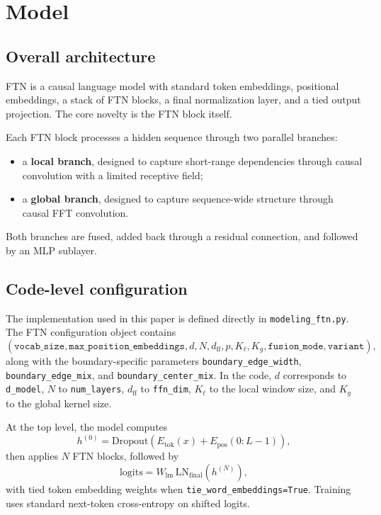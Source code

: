 \documentclass[11pt]{article}
\begin{document}
\section{Model}
\subsection{Overall architecture}
FTN is a causal language model with standard token embeddings, positional embeddings, a stack of FTN blocks, a final normalization layer, and a tied output projection. The core novelty is the FTN block itself.

Each FTN block processes a hidden sequence through two parallel branches:
\begin{itemize}[leftmargin=1.5em]
    \item a \textbf{local branch}, designed to capture short-range dependencies through causal convolution with a limited receptive field;
    \item a \textbf{global branch}, designed to capture sequence-wide structure through causal FFT convolution.
\end{itemize}

Both branches are fused, added back through a residual connection, and followed by an MLP sublayer.

\subsection{Code-level configuration}
The implementation used in this paper is defined directly in \texttt{modeling\_ftn.py}. The FTN configuration object contains
\begin{equation}
    (\texttt{vocab\_size}, \texttt{max\_position\_embeddings}, d, N, d_{\mathrm{ff}}, p,
    K_{\ell}, K_g, \texttt{fusion\_mode}, \texttt{variant}),
\end{equation}
along with the boundary-specific parameters \texttt{boundary\_edge\_width}, \texttt{boundary\_edge\_mix}, and \texttt{boundary\_center\_mix}. In the code, $d$ corresponds to \texttt{d\_model}, $N$ to \texttt{num\_layers}, $d_{\mathrm{ff}}$ to \texttt{ffn\_dim}, $K_{\ell}$ to the local window size, and $K_g$ to the global kernel size.

At the top level, the model computes
\begin{equation}
    h^{(0)} = \mathrm{Dropout}\left(E_{\mathrm{tok}}(x) + E_{\mathrm{pos}}(0{:}L-1)\right),
\end{equation}
then applies $N$ FTN blocks, followed by
\begin{equation}
    \mathrm{logits} = W_{\mathrm{lm}}\, \mathrm{LN}_{\mathrm{final}}(h^{(N)}),
\end{equation}
with tied token embedding weights when \texttt{tie\_word\_embeddings=True}. Training uses standard next-token cross-entropy on shifted logits.
\end{document}
